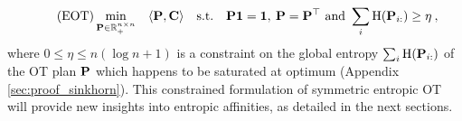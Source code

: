 \begin{equation}
\tag{EOT}
\label{eq:entropy_constrained_OT}
\min_{\mathbf{P} \in \mathbb{R}_{+}^{n \times n}} \quad \langle \mathbf{P}, \mathbf{C} \rangle \quad \text{s.t.} \quad \mathbf{P} \bm{1} = \bm{1}, \: \mathbf{P} = \mathbf{P}^\top \text{ and } \sum_i \operatorname{H}(\mathbf{P}_{i:}) \geq \eta \:,
\end{equation}
where $0 \leq \eta \leq n (\log n + 1)$ is a constraint on the global entropy $\sum_i \operatorname{H}(\mathbf{P}_{i:})$ of the OT plan $\mathbf{P}$ which happens to be saturated at optimum (Appendix \ref{sec:proof_sinkhorn}). This constrained formulation of symmetric entropic OT will provide new insights into entropic affinities, as detailed in the next sections.






